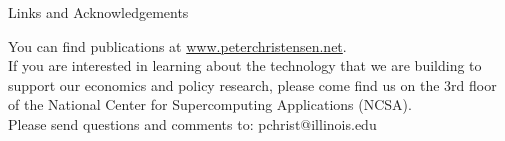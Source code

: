 \documentclass[newPxFont]{beamer}
\begin{document}
%
%

\begin{frame}{Links and Acknowledgements}
	
You can find publications at \url{www.peterchristensen.net}.\\
\vspace{1em}
If you are interested in learning about the technology that we are building to support our economics and policy research, please come find us on the 3rd floor of the National Center for Supercomputing Applications (NCSA).\\
\vspace{1em}	
Please send questions and comments to: pchrist@illinois.edu
\end{frame}
\end{document}
